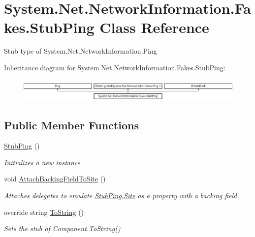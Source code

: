 \hypertarget{class_system_1_1_net_1_1_network_information_1_1_fakes_1_1_stub_ping}{\section{System.\-Net.\-Network\-Information.\-Fakes.\-Stub\-Ping Class Reference}
\label{class_system_1_1_net_1_1_network_information_1_1_fakes_1_1_stub_ping}
}


Stub type of System.\-Net.\-Network\-Information.\-Ping 


Inheritance diagram for System.\-Net.\-Network\-Information.\-Fakes.\-Stub\-Ping\-:\begin{figure}[H]
\begin{center}
\leavevmode
\includegraphics[height=1.188960cm]{class_system_1_1_net_1_1_network_information_1_1_fakes_1_1_stub_ping}
\end{center}
\end{figure}
\subsection*{Public Member Functions}
\begin{DoxyCompactItemize}
\item 
\hyperlink{class_system_1_1_net_1_1_network_information_1_1_fakes_1_1_stub_ping_a59964145b96e0371ae2cf0f687e55106}{Stub\-Ping} ()
\begin{DoxyCompactList}\small\item\em Initializes a new instance\end{DoxyCompactList}\item 
void \hyperlink{class_system_1_1_net_1_1_network_information_1_1_fakes_1_1_stub_ping_a5531e7d0d1387b2c7b1e00878b6102ff}{Attach\-Backing\-Field\-To\-Site} ()
\begin{DoxyCompactList}\small\item\em Attaches delegates to emulate \hyperlink{class_system_1_1_net_1_1_network_information_1_1_fakes_1_1_stub_ping_a25a8ee384829cd05d6f968cf8e7a5c86}{Stub\-Ping.\-Site} as a property with a backing field.\end{DoxyCompactList}\item 
override string \hyperlink{class_system_1_1_net_1_1_network_information_1_1_fakes_1_1_stub_ping_adb6640bb6adea075d1c10c0723ac8e7d}{To\-String} ()
\begin{DoxyCompactList}\small\item\em Sets the stub of Component.\-To\-String()\end{DoxyCompactList}\end{DoxyCompactItemize}
